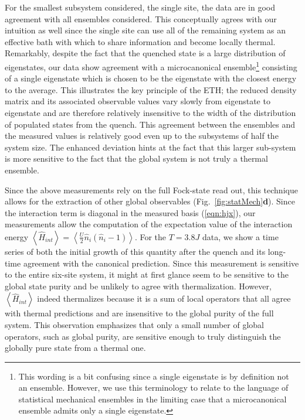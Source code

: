 For the smallest subsystem considered, the single site, the data are in good agreement with all ensembles considered. This conceptually agrees with our intuition as well since the single site can use all of the remaining system as an effective bath with which to share information and become locally thermal. Remarkably, despite the fact that the quenched state is a large distribution of eigenstates, our data show agreement with a microcanonical ensemble\footnote{This wording is a bit confusing since a single eigenstate is by definition not an ensemble. However, we use this terminology to relate to the language of statistical mechanical ensembles in the limiting case that a microcanonical ensemble admits only a single eigenstate.} consisting of a single eigenstate which is chosen to be the eigenstate with the closest energy to the average. This illustrates the key principle of the ETH; the reduced density matrix and its associated observable values vary slowly from eigenstate to eigenstate and are therefore relatively insensitive to the width of the distribution of populated states from the quench. This agreement between the ensembles and the measured values is relatively good even up to the subsystems of half the system size. The enhanced deviation hints at the fact that this larger sub-system is more sensitive to the fact that the global system is not truly a thermal ensemble.

%
%
%
%

Since the above measurements rely on the full Fock-state read out, this technique allows for the extraction of other global observables (Fig.~\ref{fig:statMech}\textbf{d}). Since  the interaction term is diagonal in the measured basis (\ref{eqn:hjx}), our measurements allow the computation of the expectation value of the interaction energy $\left \langle \hat{H}_{int} \right \rangle = \left \langle \frac{U}{2} \hat{n}_i (\hat{n}_i-1) \right \rangle$. For the $T=3.8J$ data, we show a time series of both the initial growth of this quantity after the quench and its long-time agreement with the canonical prediction. Since this measurement is sensitive to the entire six-site system, it might at first glance seem to be sensitive to the global state purity and be unlikely to agree with thermalization. However, $\left \langle \hat{H}_{int} \right \rangle$ indeed thermalizes because it is a sum of local operators that all agree with thermal predictions and are insensitive to the global purity of the full system. This observation emphasizes that only a small number of global operators, such as global purity, are sensitive enough to truly distinguish the globally pure state from a thermal one.

